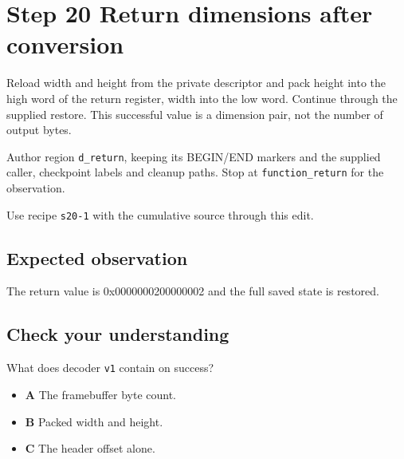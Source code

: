 \section{Step 20 Return dimensions after conversion}\label{ppm-s20}

Reload width and height from the private descriptor and pack height into the high word of the return register, width into the low word. Continue through the supplied restore. This successful value is a dimension pair, not the number of output bytes.

Author region \texttt{d\_return}, keeping its BEGIN/END markers and the supplied caller, checkpoint labels and cleanup paths. Stop at \texttt{function\_return} for the observation.

Use recipe \texttt{s20-1} with the cumulative source through this edit.

\subsection{Expected observation}
The return value is 0x0000000200000002 and the full saved state is restored.

\subsection{Check your understanding}
What does decoder \texttt{v1} contain on success?

\begin{itemize}
  \item \textbf{A} The framebuffer byte count.
  \item \textbf{B} Packed width and height.
  \item \textbf{C} The header offset alone.
\end{itemize}
